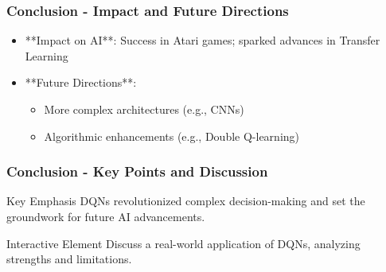 \documentclass[aspectratio=169]{beamer}
\begin{document}
\begin{frame}[fragile]
  \frametitle{Conclusion - Impact and Future Directions}
  
  \begin{itemize}
    \item **Impact on AI**: Success in Atari games; sparked advances in Transfer Learning 
    \item **Future Directions**: 
      \begin{itemize}
        \item More complex architectures (e.g., CNNs) 
        \item Algorithmic enhancements (e.g., Double Q-learning)
      \end{itemize}
  \end{itemize}
  
\end{frame}

\begin{frame}[fragile]
  \frametitle{Conclusion - Key Points and Discussion}
  
  \begin{block}{Key Emphasis}
    DQNs revolutionized complex decision-making and set the groundwork for future AI advancements.
  \end{block}
  
  \begin{block}{Interactive Element}
    Discuss a real-world application of DQNs, analyzing strengths and limitations.
  \end{block}

\end{frame}
\end{document}
